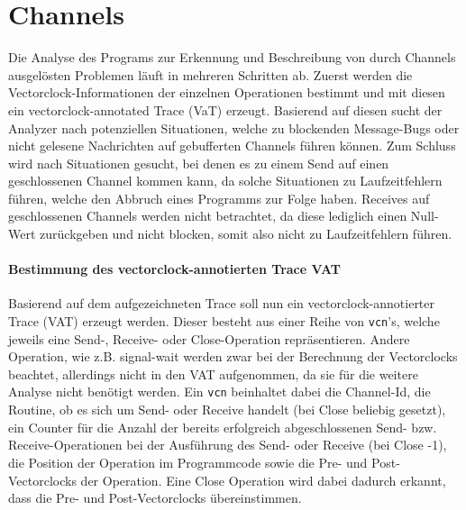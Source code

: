 \section{Channels}\label{Chap:Analyse-Sec:Channel}
Die Analyse des Programs zur Erkennung und Beschreibung von durch Channels ausgelösten 
Problemen läuft in mehreren Schritten ab. Zuerst werden die Vectorclock-Informationen 
der einzelnen Operationen bestimmt und mit diesen ein vectorclock-annotated Trace 
(VaT) erzeugt. Basierend auf diesen sucht der Analyzer nach potenziellen 
Situationen, welche zu blockenden Message-Bugs oder nicht gelesene
Nachrichten auf gebufferten Channels führen können. Zum Schluss 
wird nach Situationen gesucht, bei denen es zu einem Send auf einen 
geschlossenen Channel kommen kann, da solche Situationen zu Laufzeitfehlern 
führen, welche den Abbruch eines Programms zur Folge haben.
Receives auf geschlossenen Channels werden nicht betrachtet, da diese 
lediglich einen Null-Wert zurückgeben und nicht blocken, somit also nicht 
zu Laufzeitfehlern führen. 

\paragraph{Bestimmung des vectorclock-annotierten Trace VAT}
Basierend auf dem aufgezeichneten Trace soll nun ein vectorclock-annotierter Trace 
(VAT) erzeugt werden. Dieser besteht aus einer Reihe von \texttt{vcn}'s, 
welche jeweils eine Send-, Receive- oder Close-Operation repräsentieren.
Andere Operation, wie z.B. signal-wait werden zwar bei der Berechnung der Vectorclocks 
beachtet, allerdings nicht in den VAT aufgenommen, da sie für die weitere 
Analyse nicht benötigt werden. Ein \texttt{vcn} beinhaltet dabei die Channel-Id,
die Routine, ob es sich um Send- oder Receive handelt (bei Close beliebig gesetzt),
ein Counter für die Anzahl der bereits erfolgreich abgeschlossenen Send- bzw.
Receive-Operationen bei der Ausführung des Send- oder Receive (bei Close -1), 
die Position der Operation im Programmcode
sowie die Pre- und Post-Vectorclocks der Operation. Eine Close Operation 
wird dabei dadurch erkannt, dass die Pre- und Post-Vectorclocks übereinstimmen.


